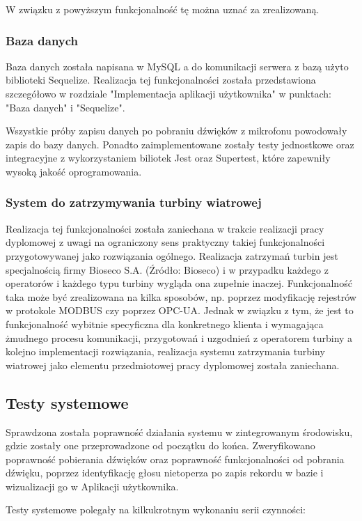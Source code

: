 \documentclass{sprz}
\begin{document}
W związku z powyższym funkcjonalność tę można uznać za zrealizowaną.

\subsubsection{Baza danych}
Baza danych została napisana w MySQL a do komunikacji serwera z bazą użyto biblioteki Sequelize. Realizacja tej funkcjonalności została przedstawiona szczegółowo w rozdziale "Implementacja aplikacji użytkownika" w punktach: "Baza danych" i "Sequelize". 

Wszystkie próby zapisu danych po pobraniu dźwięków z mikrofonu powodowały zapis do bazy danych. Ponadto zaimplementowane zostały testy jednostkowe oraz integracyjne z wykorzystaniem biliotek Jest oraz Supertest, które zapewniły wysoką jakość oprogramowania.

\subsubsection{System do zatrzymywania turbiny wiatrowej}
Realizacja tej funkcjonalności została zaniechana w trakcie realizacji pracy dyplomowej z uwagi na ograniczony sens praktyczny takiej funkcjonalności przygotowywanej jako rozwiązania ogólnego. Realizacja zatrzymań turbin jest specjalnością firmy Bioseco S.A. (Źródło: Bioseco) i w przypadku każdego z operatorów i każdego typu turbiny wygląda ona zupełnie inaczej. Funkcjonalność taka może być zrealizowana na kilka sposobów, np. poprzez modyfikację rejestrów w protokole MODBUS czy poprzez OPC-UA. Jednak w związku z tym, że jest to funkcjonalność wybitnie specyficzna dla konkretnego klienta i wymagająca żmudnego procesu komunikacji, przygotowań i uzgodnień z operatorem turbiny a kolejno implementacji rozwiązania, realizacja systemu zatrzymania turbiny wiatrowej jako elementu przedmiotowej pracy dyplomowej została zaniechana.


\subsection{Testy systemowe}
Sprawdzona została poprawność działania systemu w zintegrowanym środowisku, gdzie zostały one przeprowadzone od początku do końca. Zweryfikowano poprawność pobierania dźwięków oraz poprawność funkcjonalności od pobrania dźwięku, poprzez identyfikację głosu nietoperza po zapis rekordu w bazie i wizualizacji go w Aplikacji użytkownika.

Testy systemowe polegały na kilkukrotnym wykonaniu serii czynności:
\end{document}
